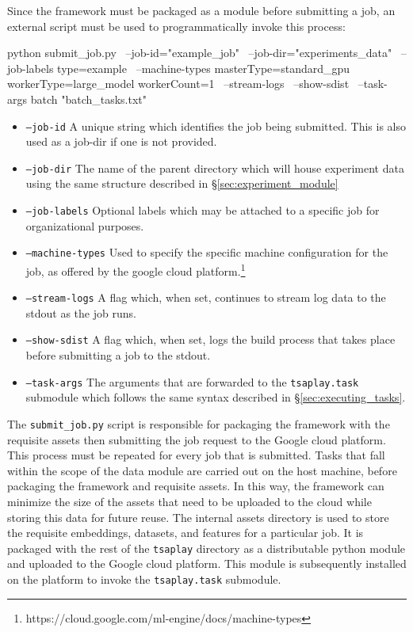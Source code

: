 \documentclass[../../fyp.tex]{subfiles}
\begin{document}
Since the framework must be packaged as a module before submitting a job, an external script must be used to programmatically invoke this process: 

\begin{code}
	python submit_job.py \ 
		--job-id="example_job" \ 
		--job-dir="experiments_data" \
		--job-labels type=example \
		--machine-types masterType=standard_gpu workerType=large_model workerCount=1 \
		--stream-logs \
		--show-sdist \
		--task-args batch "batch_tasks.txt"
\end{code}

\begin{itemize}
\item \texttt{--job-id} A unique string which identifies the job being submitted. This is also used as a job-dir if one is not provided.
\item \texttt{--job-dir} The name of the parent directory which will house experiment data using the same structure described in \S\ref{sec:experiment_module} 
\item \texttt{--job-labels} Optional labels which may be attached to a specific job for organizational purposes.
\item \texttt{--machine-types} Used to specify the specific machine configuration for the job, as offered by the google cloud platform.\footnote{https://cloud.google.com/ml-engine/docs/machine-types} 
\item \texttt{--stream-logs} A flag which, when set, continues to stream log data to the stdout as the job runs.
\item \texttt{--show-sdist} A flag which, when set, logs the build process that takes place before submitting a job to the stdout.
\item \texttt{--task-args} The arguments that are forwarded to the \texttt{tsaplay.task} submodule which follows the same syntax described in \S\ref{sec:executing_tasks}.
\end{itemize}

The \texttt{submit\_job.py} script is responsible for packaging the framework with the requisite assets then submitting the job request to the Google cloud platform. This process must be repeated for every job that is submitted. Tasks that fall within the scope of the data module are carried out on the host machine, before packaging the framework and requisite assets. In this way, the framework can minimize the size of the assets that need to be uploaded to the cloud while storing this data for future reuse. The internal assets directory is used to store the requisite embeddings, datasets, and features for a particular job. It is packaged with the rest of the \texttt{tsaplay} directory as a distributable python module and uploaded to the Google cloud platform. This module is subsequently installed on the platform to invoke the \texttt{tsaplay.task} submodule.
\end{document}
